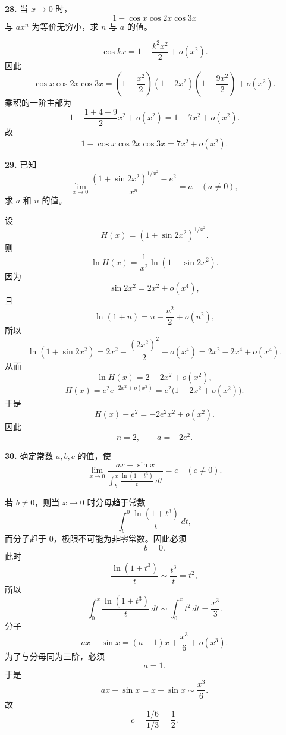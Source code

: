 \begin{problemblock}
\textbf{28.} 当 \(x\to0\) 时，
\[
1-\cos x\cos2x\cos3x
\]
与 \(ax^n\) 为等价无穷小，求 \(n\) 与 \(a\) 的值。
\end{problemblock}

\begin{solutionblock}
\[
\cos kx=1-\frac{k^2x^2}{2}+o(x^2).
\]
因此
\[
\cos x\cos2x\cos3x
=\left(1-\frac{x^2}{2}\right)
\left(1-2x^2\right)
\left(1-\frac{9x^2}{2}\right)+o(x^2).
\]
乘积的一阶主部为
\[
1-\frac{1+4+9}{2}x^2+o(x^2)
=1-7x^2+o(x^2).
\]
故
\[
1-\cos x\cos2x\cos3x
=7x^2+o(x^2).
\]
\end{solutionblock}

\begin{problemblock}
\textbf{29.} 已知
\[
\lim_{x\to0}
\frac{(1+\sin2x^2)^{1/x^2}-e^2}{x^n}
=a\quad(a\ne0),
\]
求 \(a\) 和 \(n\) 的值。
\end{problemblock}

\begin{solutionblock}
设
\[
H(x)=(1+\sin2x^2)^{1/x^2}.
\]
则
\[
\ln H(x)=\frac1{x^2}\ln(1+\sin2x^2).
\]
因为
\[
\sin2x^2=2x^2+o(x^4),
\]
且
\[
\ln(1+u)=u-\frac{u^2}{2}+o(u^2),
\]
所以
\[
\ln(1+\sin2x^2)
=2x^2-\frac{(2x^2)^2}{2}+o(x^4)
=2x^2-2x^4+o(x^4).
\]
从而
\[
\ln H(x)=2-2x^2+o(x^2),
\]
\[
H(x)=e^2e^{-2x^2+o(x^2)}
=e^2\bigl(1-2x^2+o(x^2)\bigr).
\]
于是
\[
H(x)-e^2=-2e^2x^2+o(x^2).
\]
因此
\[
n=2,\qquad a=-2e^2.
\]
\end{solutionblock}

\begin{problemblock}
\textbf{30.} 确定常数 \(a,b,c\) 的值，使
\[
\lim_{x\to0}
\frac{ax-\sin x}
{\displaystyle\int_b^x\frac{\ln(1+t^3)}{t}\,dt}
=c\quad(c\ne0).
\]
\end{problemblock}

\begin{solutionblock}
若 \(b\ne0\)，则当 \(x\to0\) 时分母趋于常数
\[
\int_b^0\frac{\ln(1+t^3)}{t}\,dt,
\]
而分子趋于 0，极限不可能为非零常数。因此必须
\[
b=0.
\]
此时
\[
\frac{\ln(1+t^3)}{t}\sim\frac{t^3}{t}=t^2,
\]
所以
\[
\int_0^x\frac{\ln(1+t^3)}{t}\,dt
\sim\int_0^x t^2\,dt=\frac{x^3}{3}.
\]
分子
\[
ax-\sin x=(a-1)x+\frac{x^3}{6}+o(x^3).
\]
为了与分母同为三阶，必须
\[
a=1.
\]
于是
\[
ax-\sin x=x-\sin x\sim\frac{x^3}{6}.
\]
故
\[
c=\frac{1/6}{1/3}=\frac12.
\]
\end{solutionblock}

